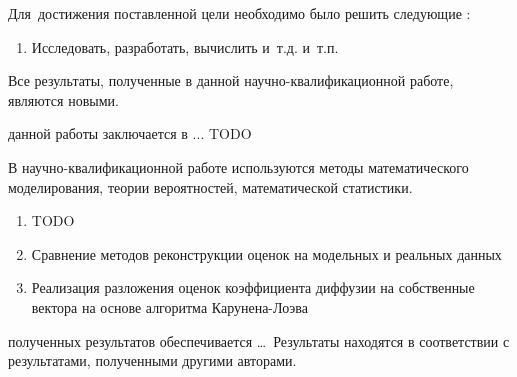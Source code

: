 Для~достижения поставленной цели необходимо было решить следующие {\tasks}:
\begin{enumerate}[beginpenalty=10000] %
  \item Исследовать, разработать, вычислить и~т.\:д. и~т.\:п.
\end{enumerate}


{\novelty}
Все результаты, полученные в данной научно-квалификационной
работе, являются новыми.
	

{\influence} данной работы заключается в ... TODO

{\methods} В научно-квалификационной работе используются методы математического моделирования, теории вероятностей, математической статистики.

{}
\begin{enumerate}[beginpenalty=10000] %
  \item TODO
  \item Сравнение методов реконструкции оценок на модельных и реальных данных
  \item Реализация разложения оценок коэффициента диффузии на собственные вектора на основе алгоритма Карунена-Лоэва
\end{enumerate}

{\reliability} полученных результатов обеспечивается \ldots \ Результаты находятся в соответствии с результатами, полученными другими авторами.


